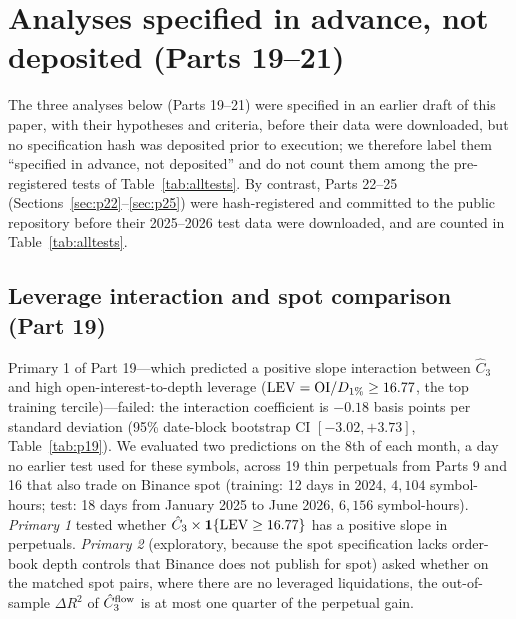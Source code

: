 \documentclass[12pt]{article}
\theoremstyle{definition}
\theoremstyle{remark}
\begin{document}
\section{Analyses specified in advance, not deposited (Parts 19--21)}
The three analyses below (Parts 19--21) were specified in an earlier draft of this paper, with their hypotheses and criteria, before their data were downloaded, but no specification hash was deposited prior to execution; we therefore label them ``specified in advance, not deposited'' and do not count them among the pre-registered tests of Table~\ref{tab:alltests}. By contrast, Parts 22--25 (Sections~\ref{sec:p22}--\ref{sec:p25}) were hash-registered and committed to the public repository before their 2025--2026 test data were downloaded, and are counted in Table~\ref{tab:alltests}.

\subsection{Leverage interaction and spot comparison (Part 19)}\label{sec:p19}
Primary 1 of Part 19---which predicted a positive slope interaction between $\hat C_3$ and high open-interest-to-depth leverage (${\rm LEV}={\rm OI}/D_{1\%}\ge16.77$, the top training tercile)---failed: the interaction coefficient is $-0.18$ basis points per standard deviation (95\% date-block bootstrap CI $[-3.02,+3.73]$, Table~\ref{tab:p19}). We evaluated two predictions on the 8th of each month, a day no earlier test used for these symbols, across 19 thin perpetuals from Parts 9 and 16 that also trade on Binance spot (training: 12 days in 2024, $4{,}104$ symbol-hours; test: 18 days from January 2025 to June 2026, $6{,}156$ symbol-hours). \emph{Primary 1} tested whether $\hat C_3\times\mathbf{1}\{{\rm LEV}\ge16.77\}$ has a positive slope in perpetuals. \emph{Primary 2} (exploratory, because the spot specification lacks order-book depth controls that Binance does not publish for spot) asked whether on the matched spot pairs, where there are no leveraged liquidations, the out-of-sample $\Delta R^2$ of $\hat C_3^{\rm flow}$ is at most one quarter of the perpetual gain.
\end{document}
